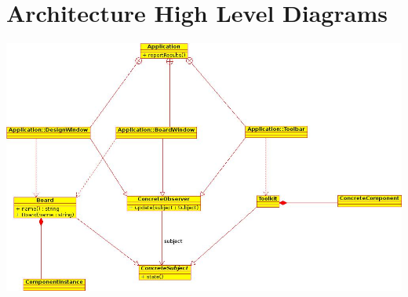 \section{Architecture High Level Diagrams}

\begin{center}
	\includegraphics[width=.9\linewidth]{UI_ClassDiagramMain.jpeg}
	\label{fig:ui_class_diagram}
\end{center}
